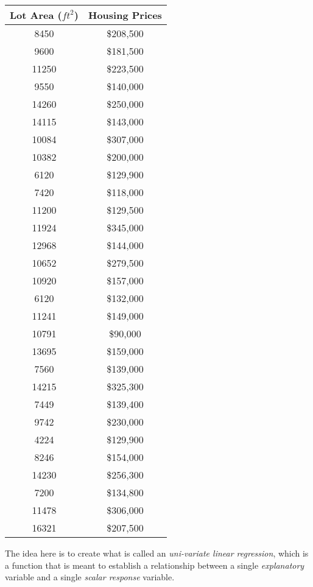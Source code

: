 \documentclass{book}[a5paper]
\begin{document}
\begin{table}
    \label{table:house_price}
    \centering
    \begin{tabular}{c|c}
        Lot Area (${ft}^2$) & Housing Prices \\
        \hline
        8450 & \$208,500 \\
        9600 & \$181,500 \\
        11250 & \$223,500 \\
        9550 & \$140,000 \\
        14260 & \$250,000 \\
        14115 & \$143,000 \\
        10084 & \$307,000 \\
        10382 & \$200,000 \\
        6120 & \$129,900 \\
        7420 & \$118,000 \\
        11200 & \$129,500 \\
        11924 & \$345,000 \\
        12968 & \$144,000 \\
        10652 & \$279,500 \\
        10920 & \$157,000 \\
        6120 & \$132,000 \\
        11241 & \$149,000 \\
        10791 & \$90,000 \\
        13695 & \$159,000 \\
        7560 & \$139,000 \\
        14215 & \$325,300 \\
        7449 & \$139,400 \\
        9742 & \$230,000 \\
        4224 & \$129,900 \\
        8246 & \$154,000 \\
        14230 & \$256,300 \\
        7200 & \$134,800 \\
        11478 & \$306,000 \\
        16321 & \$207,500 \\
    \end{tabular}
\end{table}

The idea here is to create what is called an \emph{uni-variate linear
regression}, which is a function that is meant to establish a relationship
between a single \emph{explanatory} variable and a single
\emph{scalar response} variable.
\end{document}
